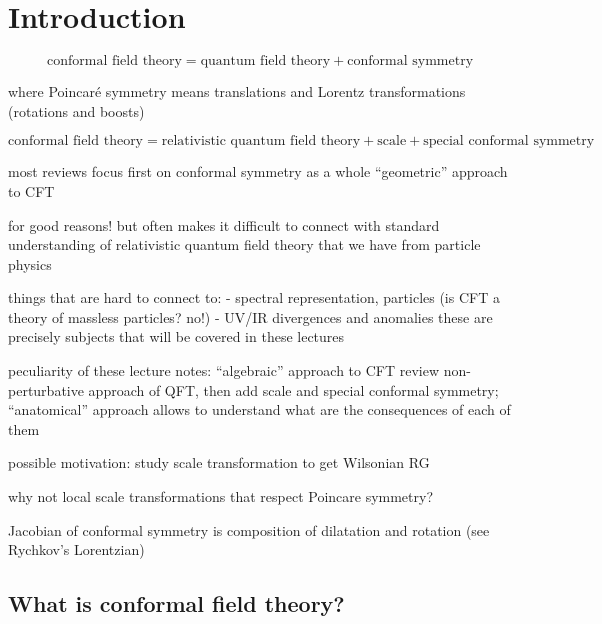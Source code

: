\documentclass[a4paper,12pt]{article}
\numberwithin{equation}{section}
\begin{document}
\newpage
\section{Introduction}

\begin{equation}
	\text{conformal field theory}
	= \text{quantum field theory} + \text{conformal symmetry}
\end{equation}


where Poincaré symmetry means translations and Lorentz transformations (rotations and boosts)

\begin{equation}
	\text{conformal field theory}
	= \text{relativistic quantum field theory} 
	+ \text{scale}
	+ \text{special conformal symmetry}
\end{equation}

most reviews focus first on conformal symmetry as a whole 
``geometric'' approach to CFT

for good reasons!
but often makes it difficult to connect with standard understanding of relativistic quantum field theory that we have from particle physics

things that are hard to connect to:
- spectral representation, particles (is CFT a theory of massless particles? no!)
- UV/IR divergences and anomalies
these are precisely subjects that will be covered in these lectures

peculiarity of these lecture notes:
``algebraic'' approach to CFT
review non-perturbative approach of QFT, then add scale and special conformal symmetry;
``anatomical'' approach allows to understand what are the consequences of each of them





possible motivation: study scale transformation to get Wilsonian RG

why not local scale transformations that respect Poincare symmetry?

Jacobian of conformal symmetry is composition of dilatation and rotation (see Rychkov's Lorentzian)




\subsection{What is conformal field theory?}
\end{document}
